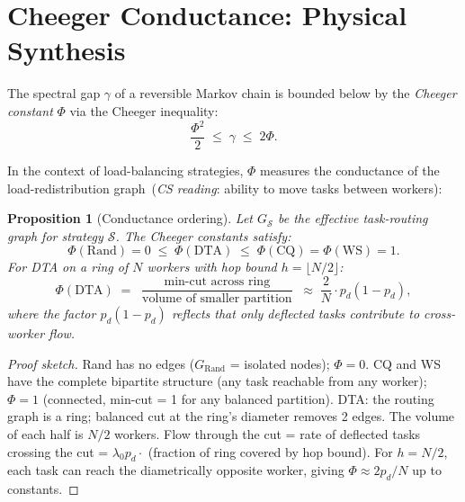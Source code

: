 \documentclass[11pt,a4paper]{article}
\newtheorem{proposition}[theorem]{Proposition}
\newcommand{\physics}[2]{#1\ \textnormal{(\emph{CS reading}: #2)}}
\begin{document}
\section{Cheeger Conductance: Physical Synthesis}
\label{sec:cheeger}

The spectral gap $\gamma$ of a reversible Markov chain is bounded below by
the \emph{Cheeger constant} $\Phi$ via the Cheeger inequality:
\begin{equation}\label{eq:cheeger}
  \frac{\Phi^2}{2} \;\le\; \gamma \;\le\; 2\Phi.
\end{equation}

In the context of load-balancing strategies, $\Phi$ measures the
\physics{conductance of the load-redistribution graph}{ability to move tasks between workers}:

\begin{proposition}[Conductance ordering]\label{prop:conductance}
Let $G_{\mathcal{S}}$ be the effective task-routing graph for strategy $\mathcal{S}$.
The Cheeger constants satisfy:
\[
  \Phi(\mathrm{Rand}) = 0 \;\le\; \Phi(\mathrm{DTA}) \;\le\; \Phi(\mathrm{CQ}) = \Phi(\mathrm{WS}) = 1.
\]
For DTA on a ring of $N$ workers with hop bound $h = \lfloor N/2 \rfloor$:
\begin{equation}\label{eq:cheeger_dta}
  \Phi(\mathrm{DTA}) \;=\; \frac{\min\text{-cut across ring}}{\text{volume of smaller partition}}
  \;\approx\; \frac{2}{N} \cdot p_d(1-p_d),
\end{equation}
where the factor $p_d(1-p_d)$ reflects that only deflected tasks contribute
to cross-worker flow.
\end{proposition}

\begin{proof}[Proof sketch]
Rand has no edges ($G_{\mathrm{Rand}}$ = isolated nodes); $\Phi = 0$.
CQ and WS have the complete bipartite structure (any task reachable from any worker);
$\Phi = 1$ (connected, min-cut = 1 for any balanced partition).
DTA: the routing graph is a ring; balanced cut at the ring's diameter removes
2 edges.  The volume of each half is $N/2$ workers.  Flow through the cut
= rate of deflected tasks crossing the cut = $\lambda_0 p_d \cdot$ (fraction of ring
covered by hop bound).  For $h = N/2$, each task can reach the diametrically
opposite worker, giving $\Phi \approx 2p_d/N$ up to constants.
\end{proof}
\end{document}
